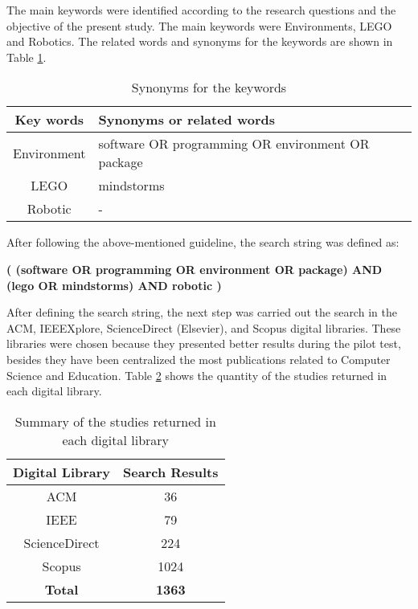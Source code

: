 \documentclass[conference]{IEEEtran}
\begin{document}
The main keywords were identified according to the research questions and the objective of the present study. The main keywords were Environments, LEGO and Robotics. The related words and synonyms for the keywords are shown in Table \ref{synonyms_keywords}.

\begin{table}[h]
\renewcommand{\arraystretch}{1.3}
\caption{Synonyms for the keywords}
\label{synonyms_keywords}
\centering
\begin{tabular}{|c||p{5cm}|}
\hline \textbf{Key words} &\textbf{Synonyms or related words}\\
\hline Environment & software OR programming OR environment OR package\\
\hline LEGO & mindstorms\\
\hline Robotic & -\\
\hline
\end{tabular}
\end{table}

After following the above-mentioned guideline, the search string was defined as:
 
\begin{center} 
\textbf{( (software OR programming OR environment OR package) AND (lego OR mindstorms)  AND robotic )}
\end{center}

After defining the search string, the next step was carried out the search in the ACM, IEEEXplore, ScienceDirect (Elsevier), and Scopus digital libraries. These libraries were chosen because they presented better results during the pilot test, besides they have been centralized the most publications related to Computer Science and Education. Table \ref{summary_library} shows the quantity of the studies returned in each digital library.


\begin{table}[h]
\renewcommand{\arraystretch}{1.3}
\caption{Summary of the studies returned in each digital library}
\label{summary_library}
\centering
\begin{tabular}{|c||c|}
\hline \textbf{Digital Library} &\textbf{Search Results}\\
\hline ACM	 & 36\\
\hline IEEE & 79\\
\hline ScienceDirect & 224\\
\hline Scopus & 1024\\
\hline \textbf{Total} & \textbf{1363}\\
\hline
\end{tabular}
\end{table}
\end{document}
